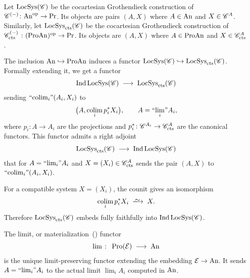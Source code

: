 \documentclass[english,svgnames,table]{article}
\begin{document}
    \begin{remark}
    \label{rmrk:ind-local-system}
        Let $\mathrm{LocSys}(\mathscr{C})$ be the cocartesian Grothendieck construction of $\mathscr{C}^{(-)} \colon \mathrm{An}^{\mathrm{op}} \to \operatorname{Pr}$. Its objects are pairs $(A, X)$ where $A \in \mathrm{An}$ and $X \in \mathscr{C}^A$. 
        Similarly, let $\mathrm{LocSys}_{\mathrm{cts}}(\mathscr{C})$ be the cocartesian Grothendieck construction of $\mathscr{C}_{\mathrm{cts}}^{(-)} \;\colon (\mathrm{ProAn})^{\mathrm{op}} \to \operatorname{Pr}$. Its objects are $(A, X)$ where $A \in \mathrm{ProAn}$ and $X \in \mathscr{C}^A_{\mathrm{cts}}$.

        The inclusion $\mathrm{An} \hookrightarrow \mathrm{ProAn}$ induces a functor $\mathrm{LocSys}(\mathscr{C}) \hookrightarrow \mathrm{LocSys}_{\mathrm{cts}}(\mathscr{C})$. Formally extending it, we get a functor
        \begin{equation*}
            \operatorname{Ind}\mathrm{LocSys}(\mathscr{C}) \;\longrightarrow\; \mathrm{LocSys}_{\mathrm{cts}}(\mathscr{C})
        \end{equation*}
        sending $\text{``$\operatorname*{colim}_{i}$''}(A_i,X_i)$ to
        \begin{equation*}
            \big(A,\operatorname*{colim}_i p_i^*X_i\big), \qquad A=\text{``$\lim_{i}$''} A_i,
        \end{equation*}
        where $p_i\colon A\to A_i$ are the projections and $p_i^*\colon\mathscr{C}^{A_i}\to\mathscr{C}_{\mathrm{cts}}^A$ are the canonical functors. This functor admits a right adjoint
        \begin{equation*}
            \mathrm{LocSys}_{\mathrm{cts}}(\mathscr{C}) \;\longrightarrow\; \operatorname{Ind}\mathrm{LocSys}(\mathscr{C})
        \end{equation*}
        that for $A = \text{``$\lim_{i}$''} A_i$ and $X = (X_i) \in \mathscr{C}^A_{\mathrm{cts}}$ sends the pair $(A,X)$ to $\text{``$\operatorname*{colim}_{i}$''} (A_i, X_i)$.

        For a compatible system $X=(X_i)$, the counit gives an isomorphism
        \begin{equation*}
            \colim_i p_i^*X_i \;\isotoo\; X.
        \end{equation*}
        Therefore $\mathrm{LocSys}_{\mathrm{cts}}(\mathscr{C})$ embeds fully faithfully into $\operatorname{Ind}\mathrm{LocSys}(\mathscr{C})$.

    \end{remark}

    The limit, or materialization~(\cite[Remark~E.2.1.4]{Lurie-SAG}) functor
    \begin{equation*}
        \lim \;\colon\; \operatorname{Pro}(\mathcal{E}) \;\longrightarrow\; \mathrm{An}
    \end{equation*}
    is the unique limit-preserving functor extending the embedding $\mathcal{E} \to \mathrm{An}$. It sends $A = \text{``$\lim_{i}$''} A_i$ to the actual limit $\lim_i A_i$ computed in $\mathrm{An}$.
\end{document}
